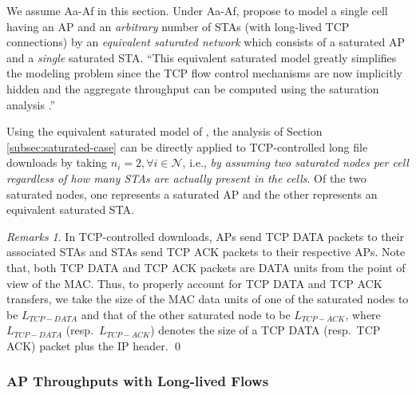 \documentclass[10pt,a4paper,journal]{IEEEtran}
\theoremstyle{definition}
\theoremstyle{remark}
\newtheorem{remark}{Remarks}[section] \newtheorem{discussion}{Discussion}[section] \newtheorem{example}{Example}[section]
\theoremstyle{plain}
\begin{document}
We assume Aa-Af in this section. Under Aa-Af, \cite{wanet.bruno08TCPeqvSatModel} propose to model a single cell having an AP and an \textit{arbitrary} number of STAs (with long-lived TCP connections) by an \textit{equivalent saturated network} which consists of a saturated AP and a \textit{single} saturated STA. ``This equivalent saturated model greatly simplifies the modeling problem since the TCP flow control mechanisms are now implicitly hidden and the aggregate throughput can be computed using the saturation analysis \cite{wanet.bruno08TCPeqvSatModel}.'' 

Using the equivalent saturated model of \cite{wanet.bruno08TCPeqvSatModel}, the analysis of Section \ref{subsec:saturated-case} can be directly applied to TCP-controlled long file downloads by taking $n_i = 2, \forall i \in \mathcal{N}$, i.e., \textit{by assuming two saturated nodes per cell regardless of how many STAs are actually present in the cells}. Of the two saturated nodes, one represents a saturated AP and the other represents an equivalent saturated STA.


\begin{remark}
\label{rmk:TCP-up-down-traffic}
In TCP-controlled downloads, APs send TCP DATA packets to their associated STAs and STAs send TCP ACK packets to their respective APs. Note that, both TCP DATA and TCP ACK packets are DATA units from the point of view of the MAC. Thus, to properly account for TCP DATA and TCP ACK transfers, we take the size of the MAC data units of one of the saturated nodes to be $L_{TCP-DATA}$ and that of the other saturated node to be $L_{TCP-ACK}$, where $L_{TCP-DATA}$ (resp.~$L_{TCP-ACK}$) denotes the size of a TCP DATA (resp.~TCP ACK) packet plus the IP header. \hfill \qed
\end{remark}


\subsubsection{AP Throughputs with Long-lived Flows}
\label{subsubsec:computing-cell-throughputs-TCP-Long}
\end{document}
